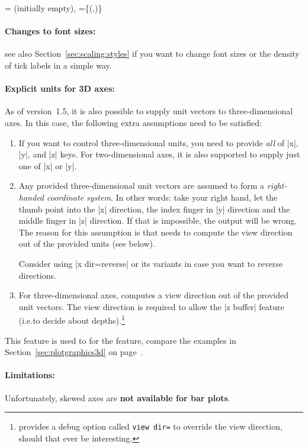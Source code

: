 \begin{pgfplotsxykeylist}{%
    \x= (initially empty),
    \x={\{(,)\}}%
}
    \paragraph{Changes to font sizes:}

    see also Section~\ref{sec:scaling:styles} if you want to change font sizes
    or the density of tick labels in a simple way.


    \paragraph{Explicit units for 3D axes:}

    As of version~1.5, it is also possible to supply unit vectors to
    three-dimensional axes. In this case, the following extra assumptions need
    to be satisfied:
    \begin{enumerate}
        \item If you want to control three-dimensional units, you need to
            provide \emph{all} of |x|, |y|, and |z| keys. For two-dimensional
            axes, it is also supported to supply just one of |x| or |y|.
        \item Any provided three-dimensional unit vectors are assumed to form
            a \emph{right-handed coordinate system}. In other words: take
            your right hand, let the thumb point into the |x| direction, the
            index finger in |y| direction and the middle finger in |z|
            direction. If that is impossible, the \PGFPlots{} output will be
            wrong. The reason for this assumption is that \PGFPlots{} needs
            to compute the view direction out of the provided units (see
            below).

            Consider using |x dir=reverse| or its variants in case you want
            to reverse directions.
        \item For three-dimensional axes, \PGFPlots{} computes a view
            direction out of the provided unit vectors. The view direction is
            required to allow the |z buffer| feature (i.e.\@ to decide about
            depths).\footnote{\PGFPlots{} provides a debug option called
            \texttt{view dir=} to override the view
            direction, should that ever be interesting.}
    \end{enumerate}
    This feature is used to for the  feature,
    compare the examples in Section~\ref{sec:plotgraphics3d} on
    page~\pageref{sec:plotgraphics3d}.


    \paragraph{Limitations:}

    Unfortunately, skewed axes are \textbf{not available for bar plots}.
\end{pgfplotsxykeylist}

